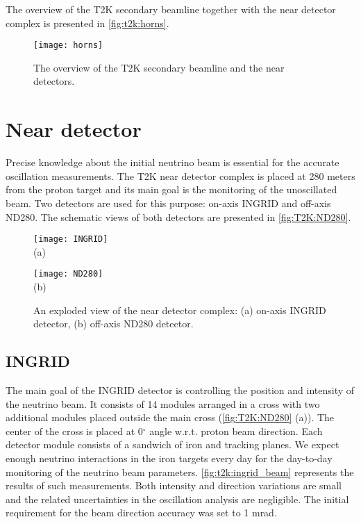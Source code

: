 \documentclass[../main.tex]{subfiles}
\begin{document}
The overview of the T2K secondary beamline together with the near detector complex is presented in \autoref{fig:t2k:horns}.

\begin{figure}[!ht]
  \centering
  \texttt{[image: horns]}
  \caption{The overview of the T2K secondary beamline and the near detectors.}
  \label{fig:t2k:horns}
\end{figure}

\section{Near detector}
\label{sec:T2K:nd}
Precise knowledge about the initial neutrino beam is essential for the accurate oscillation measurements. The T2K near detector complex is placed at 280 meters from the proton target and its main goal is the monitoring of the unoscillated beam. Two detectors are used for this purpose: on-axis INGRID and off-axis ND280. The schematic views of both detectors are presented in \autoref{fig:T2K:ND280}.

\begin{figure}[!ht]
  \centering
  \begin{minipage}{0.49\linewidth}
    \centering
    \texttt{[image: INGRID]} \\ (a)
  \end{minipage}
  \begin{minipage}{0.49\linewidth}
    \centering
    \texttt{[image: ND280]} \\ (b)
  \end{minipage}
    \caption{An exploded view of the near detector complex: (a) on-axis INGRID detector, (b) off-axis ND280 detector.}
    \label{fig:T2K:ND280}
\end{figure}

\subsection{INGRID}
The main goal of the INGRID detector is controlling the position and intensity of the neutrino beam. It consists of 14 modules arranged in a cross with two additional modules placed outside the main cross (\autoref{fig:T2K:ND280} (a)). The center of the cross is placed at 0$^\circ$ angle w.r.t. proton beam direction. Each detector module consists of a sandwich of iron and tracking planes. We expect enough neutrino interactions in the iron targets every day for the day-to-day monitoring of the neutrino beam parameters. \autoref{fig:t2k:ingrid_beam} represents the results of such measurements. Both intensity and direction variations are small and the related uncertainties in the oscillation analysis are negligible. The initial requirement for the beam direction accuracy was set to 1 mrad.
\end{document}
